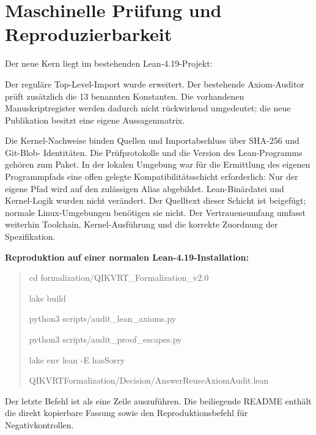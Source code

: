 \documentclass[11pt,a4paper]{article}
\begin{document}
\section{Maschinelle Prüfung und Reproduzierbarkeit}
Der neue Kern liegt im bestehenden Lean-4.19-Projekt:
\begin{quote}\small
{}\par
{}
\end{quote}
Der reguläre Top-Level-Import wurde erweitert. Der bestehende Axiom-Auditor prüft
zusätzlich die 13 benannten Konstanten. Die vorhandenen Manuskriptregister werden
dadurch nicht rückwirkend umgedeutet; die neue Publikation besitzt eine eigene
Aussagenmatrix.



Die Kernel-Nachweise binden Quellen und Importabschluss über SHA-256 und Git-Blob-
Identitäten. Die Prüfprotokolle und die Version des Lean-Programms gehören zum
Paket. In der lokalen Umgebung war für die Ermittlung des eigenen Programmpfads
eine offen gelegte Kompatibilitätsschicht erforderlich: Nur der eigene Pfad
 wird auf den zulässigen Alias
 abgebildet. Lean-Binärdatei und Kernel-Logik wurden nicht
verändert. Der Quelltext dieser Schicht ist beigefügt; normale Linux-Umgebungen
benötigen sie nicht. Der Vertrauensumfang umfasst weiterhin Toolchain,
Kernel-Ausführung und die korrekte Zuordnung der Spezifikation.

\textbf{Reproduktion auf einer normalen Lean-4.19-Installation:}
\begin{quote}\small\ttfamily
cd formalization/QIKVRT\_Formalization\_v2.0\par
lake build\par
python3 scripts/audit\_lean\_axioms.py\par
python3 scripts/audit\_proof\_escapes.py\par
lake env lean -E hasSorry\par
\hspace*{3mm}QIKVRTFormalization/Decision/AnswerReuseAxiomAudit.lean
\end{quote}
Der letzte Befehl ist als eine Zeile auszuführen. Die beiliegende README enthält
die direkt kopierbare Fassung sowie den Reproduktionsbefehl für Negativkontrollen.
\end{document}
